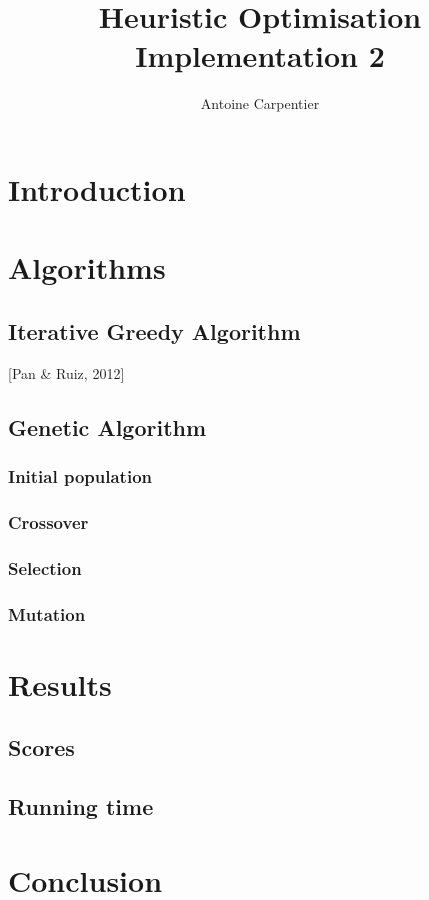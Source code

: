 \documentclass[a4paper,10pt]{article}
\title{Heuristic Optimisation\\Implementation 2}
\author{Antoine Carpentier}
\begin{document}
\maketitle

\section{Introduction}

\section{Algorithms}

\subsection{Iterative Greedy Algorithm}

[Pan \& Ruiz, 2012]

\subsection{Genetic Algorithm}

\subsubsection{Initial population}

\subsubsection{Crossover}

\subsubsection{Selection}

\subsubsection{Mutation}

\section{Results}

\subsection{Scores}

\subsection{Running time}

\section{Conclusion}
\end{document}
